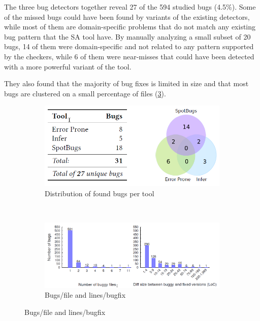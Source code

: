 \documentclass{article}
\begin{document}
 The three bug detectors together reveal 27 of the 594 studied bugs (4.5\%). Some of the missed bugs could have been found by variants of the existing detectors, while most of them are domain-specific problems that do not match any existing bug pattern that the SA tool have. By manually analyzing a small subset of 20 bugs, 14 of them were domain-specific and not related to any pattern supported by the checkers, while 6 of them were near-misses that could have been detected with a more powerful variant of the tool.

 They also found that the majority of bug fixes is limited in size and that most bugs are clustered on a small percentage of files (\cref{how_many_bugs:fixsize}).

 \begin{figure}[H]
     \begin{subfigure}{1\textwidth}
         \centering
         \includegraphics[scale=0.4]{./src/how_many_bugs_partition.png}
         \caption{Distribution of found bugs per tool}\label{how_many_bugs:partition}
     \end{subfigure}\\
     \begin{subfigure}{1\textwidth}
         \centering
         \includegraphics[scale=0.4]{./src/how_many_bugs_fixsize.png}
         \caption{Bugs/file and lines/bugfix}\label{how_many_bugs:fixsize}
     \end{subfigure}
 \end{figure}
\end{document}
